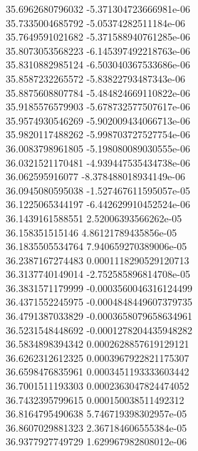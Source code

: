 {35.6962680796032 -5.371304723666981e-06 \\
35.7335004685792 -5.05374282511184e-06 \\
35.7649591021682 -5.371588940761285e-06 \\
35.8073053568223 -6.145397492218763e-06 \\
35.8310882985124 -6.503040367533686e-06 \\
35.8587232265572 -5.83822793487343e-06 \\
35.8875608807784 -5.484824669110822e-06 \\
35.9185576579903 -5.678732577507617e-06 \\
35.9574930546269 -5.902009434066713e-06 \\
35.9820117488262 -5.998703727527754e-06 \\
36.0083798961805 -5.198080089030555e-06 \\
36.0321521170481 -4.939447535434738e-06 \\
36.062595916077 -8.378488018934149e-06 \\
36.0945080595038 -1.527467611595057e-05 \\
36.1225065344197 -6.442629910452524e-06 \\
36.1439161588551 2.52006393566262e-05 \\
36.158351515146 4.86121789435856e-05 \\
36.1835505534764 7.940659270389006e-05 \\
36.2387167274483 0.0001118290529120713 \\
36.3137740149014 -2.752585896814708e-05 \\
36.3831571179999 -0.0003560046316124499 \\
36.4371552245975 -0.0004848449607379735 \\
36.4791387033829 -0.0003658079658634961 \\
36.5231548448692 -0.0001278204435948282 \\
36.5834898394342 0.0002628857619129121 \\
36.6262312612325 0.0003967922821175307 \\
36.6598476835961 0.0003451193333603442 \\
36.7001511193303 0.0002363047824474052 \\
36.7432395799615 0.000150038511492312 \\
36.8164795490638 5.746719398302957e-05 \\
36.8607029881323 2.367184606555384e-05 \\
36.9377927749729 1.629967982808012e-06 \\
}
